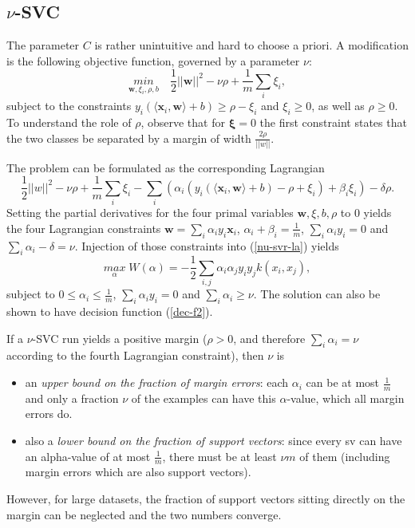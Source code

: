 \documentclass[a4paper,10pt]{article}
\begin{document}
\subsection{$\nu$-SVC}
The parameter $C$ is rather unintuitive and hard to choose a priori. A modification is the following objective function, governed by a parameter $\nu$:
\begin{equation}
 \label{obj-f3}
 \underset{\mathbf{w},\xi_i,\rho,b}{min} \quad\frac{1}{2}||\mathbf{w}||^2 -\nu \rho + \frac{1}{m} \sum_i \xi_i,
\end{equation} 
subject to the constraints $y_i(\langle\mathbf{x}_i,\mathbf{w}\rangle+b)\ge\rho-\xi_i$ and $\xi_i \ge 0$, as well as $\rho \ge 0$. To understand the role of $\rho$, observe that for $\bm{\xi}=0$ the first constraint states that the two classes be separated by a margin of width $\frac{2\rho}{||w||}$. 

The problem can be formulated as the corresponding Lagrangian
\begin{equation}
 \label{nu-svr-la}
 \frac{1}{2}||w||^2-\nu\rho+\frac{1}{m}\sum_i\xi_i-\sum_i(\alpha_i(y_i(\langle\mathbf{x}_i,\mathbf{w}\rangle+b)-\rho+\xi_i)+\beta_i\xi_i)-\delta\rho.
\end{equation} 
Setting the partial derivatives for the four primal variables $\mathbf{w}, \xi, b, \rho$ to 0 yields the four Lagrangian constraints $\mathbf{w}=\sum_i\alpha_i y_i\mathbf{x}_i$, $\alpha_i+\beta_i=\frac{1}{m}$, $\sum_i\alpha_i y_i=0$ and $\sum_i\alpha_i-\delta=\nu$.
Injection of those constraints into (\ref{nu-svr-la}) yields
\begin{equation}
\label{dual-nu}
 \underset{\alpha}{max}\;W(\alpha) = -\frac{1}{2}\sum_{i,j}\alpha_i \alpha_j y_i y_j k(x_i, x_j),
\end{equation} 
subject to $0 \le \alpha_i \le \frac{1}{m}$, $\sum_i \alpha_i y_i = 0$ and $\sum_i \alpha_i \ge \nu$. The solution can also be shown to have decision function (\ref{dec-f2}).

If a $\nu$-SVC run yields a positive margin ($\rho>0$, and therefore $\sum_i \alpha_i = \nu$ according to the fourth Lagrangian constraint), then $\nu$ is 
\begin{itemize}
 \item an \textit{upper bound on the fraction of margin errors}: each $\alpha_i$ can be at most $\frac{1}{m}$ and only a fraction $\nu$ of the examples can have this $\alpha$-value, which all margin errors do.
 \item also a \textit{lower bound on the fraction of support vectors}: since every sv can have an alpha-value of at most $\frac{1}{m}$, there must be at least $\nu m$ of them (including margin errors which are also support vectors). \\
\end{itemize}
However, for large datasets, the fraction of support vectors sitting directly on the margin can be neglected and the two numbers converge.
\end{document}
